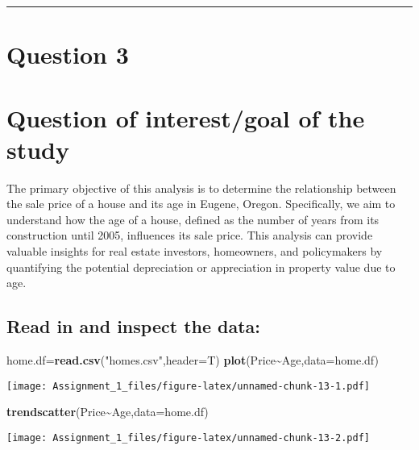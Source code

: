 \documentclass[
]{article}
\newenvironment{Shaded}{\begin{snugshade}}{\end{snugshade}}
\newcommand{\AttributeTok}[1]{\textcolor[rgb]{0.13,0.29,0.53}{#1}}
\newcommand{\FunctionTok}[1]{\textcolor[rgb]{0.13,0.29,0.53}{\textbf{#1}}}
\newcommand{\NormalTok}[1]{#1}
\newcommand{\OtherTok}[1]{\textcolor[rgb]{0.56,0.35,0.01}{#1}}
\newcommand{\SpecialCharTok}[1]{\textcolor[rgb]{0.81,0.36,0.00}{\textbf{#1}}}
\newcommand{\StringTok}[1]{\textcolor[rgb]{0.31,0.60,0.02}{#1}}
\begin{document}
\begin{center}\rule{0.5\linewidth}{0.5pt}\end{center}

\section{Question 3}\label{question-3}

\section{Question of interest/goal of the
study}\label{question-of-interestgoal-of-the-study-2}

The primary objective of this analysis is to determine the relationship
between the sale price of a house and its age in Eugene, Oregon.
Specifically, we aim to understand how the age of a house, defined as
the number of years from its construction until 2005, influences its
sale price. This analysis can provide valuable insights for real estate
investors, homeowners, and policymakers by quantifying the potential
depreciation or appreciation in property value due to age.

\subsection{Read in and inspect the
data:}\label{read-in-and-inspect-the-data-2}

\begin{Shaded}
\begin{Highlighting}[]
\NormalTok{home.df}\OtherTok{=}\FunctionTok{read.csv}\NormalTok{(}\StringTok{"homes.csv"}\NormalTok{,}\AttributeTok{header=}\NormalTok{T)}
\FunctionTok{plot}\NormalTok{(Price}\SpecialCharTok{\textasciitilde{}}\NormalTok{Age,}\AttributeTok{data=}\NormalTok{home.df)}
\end{Highlighting}
\end{Shaded}

\texttt{[image: Assignment\_1\_files/figure-latex/unnamed-chunk-13-1.pdf]}

\begin{Shaded}
\begin{Highlighting}[]
\FunctionTok{trendscatter}\NormalTok{(Price}\SpecialCharTok{\textasciitilde{}}\NormalTok{Age,}\AttributeTok{data=}\NormalTok{home.df)}
\end{Highlighting}
\end{Shaded}

\texttt{[image: Assignment\_1\_files/figure-latex/unnamed-chunk-13-2.pdf]}
\end{document}
